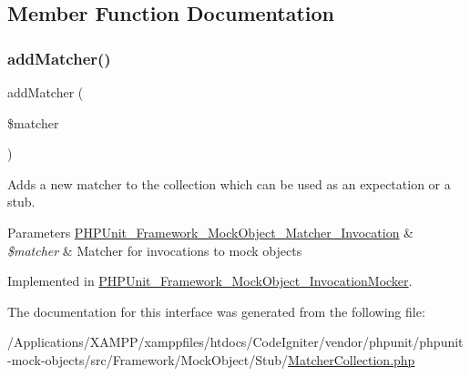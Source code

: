 \subsection{Member Function Documentation}
\mbox{\label{interface_p_h_p_unit___framework___mock_object___stub___matcher_collection_aa69f965014eff38ff4c86a3e10a5420a}} 
\subsubsection{\texorpdfstring{add\+Matcher()}{addMatcher()}}
{\footnotesize\ttfamily add\+Matcher (\begin{DoxyParamCaption}\item[{\mbox{\hyperlink{interface_p_h_p_unit___framework___mock_object___matcher___invocation}{P\+H\+P\+Unit\+\_\+\+Framework\+\_\+\+Mock\+Object\+\_\+\+Matcher\+\_\+\+Invocation}}}]{\$matcher }\end{DoxyParamCaption})}

Adds a new matcher to the collection which can be used as an expectation or a stub.


\begin{DoxyParams}[1]{Parameters}
\mbox{\hyperlink{interface_p_h_p_unit___framework___mock_object___matcher___invocation}{P\+H\+P\+Unit\+\_\+\+Framework\+\_\+\+Mock\+Object\+\_\+\+Matcher\+\_\+\+Invocation}} & {\em \$matcher} & Matcher for invocations to mock objects \\
\hline
\end{DoxyParams}


Implemented in \mbox{\hyperlink{class_p_h_p_unit___framework___mock_object___invocation_mocker_aa69f965014eff38ff4c86a3e10a5420a}{P\+H\+P\+Unit\+\_\+\+Framework\+\_\+\+Mock\+Object\+\_\+\+Invocation\+Mocker}}.



The documentation for this interface was generated from the following file\+:\begin{DoxyCompactItemize}
\item 
/\+Applications/\+X\+A\+M\+P\+P/xamppfiles/htdocs/\+Code\+Igniter/vendor/phpunit/phpunit-\/mock-\/objects/src/\+Framework/\+Mock\+Object/\+Stub/\mbox{\hyperlink{_matcher_collection_8php}{Matcher\+Collection.\+php}}\end{DoxyCompactItemize}
